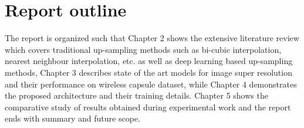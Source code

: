 \section{Report outline}
The report is organized such that Chapter 2 shows the extensive literature review which covers traditional up-sampling methods such as bi-cubic interpolation, nearest neighbour interpolation, etc. as well as deep learning based up-sampling methods, Chapter 3 describes state of the art models for image super resolution and their performance on wireless capsule dataset, while Chapter 4 demonstrates the proposed architecture and their training details.
Chapter 5 shows the comparative study of results obtained during experimental work and the report ends with summary and future scope.



